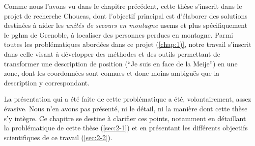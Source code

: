 Comme nous l'avons vu dans le chapitre précédent, cette thèse
s'inscrit dans le projet de recherche Choucas, dont l'objectif
principal est d’élaborer des solutions destinées à aider les
\emph{unités de secours en montagne} \acp{usem} et plus spécifiquement
le \ac{pghm} de Grenoble, à localiser des personnes perdues en
montagne. Parmi toutes les problématiques abordées dans ce projet
(\autoref{chap:1)}, notre travail s'inscrit dans celle visant à
développer des méthodes et des outils permettant de transformer une
description de position (\eg \enquote{Je suis en face de la Meije}) en
une zone, dont les coordonnées sont connues et donc moins ambiguës que
la description y correspondant.

La présentation qui a été faite de cette problématique a été,
volontairement, assez évasive. Nous n'en avons pas présenté, ni le
détail, ni la manière dont cette thèse s'y intègre. Ce chapitre se
destine à clarifier ces points, notamment en détaillant la
problématique de cette thèse (\autoref{sec:2-1}) et en présentant les
différents objectifs scientifiques de ce travail (\autoref{sec:2-2}).

